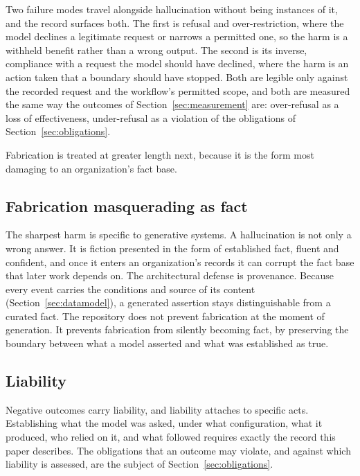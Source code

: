 \documentclass[11pt]{article}
\begin{document}
Two failure modes travel alongside hallucination without being instances of it,
and the record surfaces both. The first is refusal and over-restriction, where
the model declines a legitimate request or narrows a permitted one, so the harm
is a withheld benefit rather than a wrong output. The second is its inverse,
compliance with a request the model should have declined, where the harm is an
action taken that a boundary should have stopped. Both are legible only against
the recorded request and the workflow's permitted scope, and both are measured
the same way the outcomes of Section~\ref{sec:measurement} are: over-refusal as
a loss of effectiveness, under-refusal as a violation of the obligations of
Section~\ref{sec:obligations}.

Fabrication is treated at greater length next, because it is the form most
damaging to an organization's fact base.

\subsection{Fabrication masquerading as fact}

The sharpest harm is specific to generative systems. A hallucination is not only
a wrong answer. It is fiction presented in the form of established fact, fluent
and confident, and once it enters an organization's records it can corrupt the
fact base that later work depends on. The architectural defense is provenance.
Because every event carries the conditions and source of its content
(Section~\ref{sec:datamodel}), a generated assertion stays distinguishable from a
curated fact. The repository does not prevent fabrication at the moment of
generation. It prevents fabrication from silently becoming fact, by preserving
the boundary between what a model asserted and what was established as true.

\subsection{Liability}

Negative outcomes carry liability, and liability attaches to specific acts.
Establishing what the model was asked, under what configuration, what it
produced, who relied on it, and what followed requires exactly the record this
paper describes. The obligations that an outcome may violate, and against which
liability is assessed, are the subject of Section~\ref{sec:obligations}.

\end{document}
